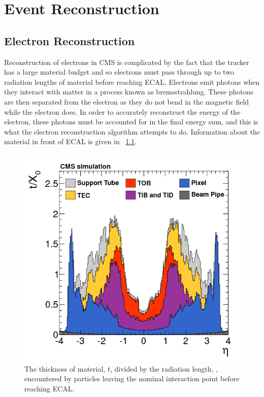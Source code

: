 \chapter{Event Reconstruction}
\label{reconstruction_chapter}

\section{Electron Reconstruction}
\label{sec:electron_reconstruction}

Reconstruction of electrons in CMS is complicated by the fact that the tracker
has a large material budget and so electrons must pass through up to two
radiation lengths of material before reaching ECAL. Electrons emit photons when
they interact with matter in a process known as bremsstrahlung. These photons
are then separated from the electron as they do not bend in the magnetic field
while the electron does. In order to accurately reconstruct the energy of the
electron, these photons must be accounted for in the final energy sum, and this
is what the electron reconstruction algorithm attempts to do. Information about
the material in front of ECAL is given in
\FIG~\ref{fig:tracker_material}\cite{cms_tracker_2014}.

\begin{figure}[!htbp]
    \centering
    \includegraphics[width=\textwidth]{figures/tracker_material_budget.png}
    \caption[
        Material thickness infront of of ECAL.
    ]{
        The thickness of material, $t$, divided by the radiation length,
        \radiationlength, encountered by particles leaving the nominal
        interaction point before reaching ECAL.
    }
    \label{fig:tracker_material}
\end{figure}

